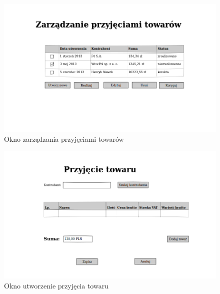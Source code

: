 \begin{figure}[!htb]
  \begin{center}
    \includegraphics[scale=0.45]{../img/interfejs/zarzadzanie-przyjeciami-towaru.png}
  \end{center}
  \caption{Okno zarządzania przyjęciami towarów}
\end{figure}
\FloatBarrier

\begin{figure}[!htb]
  \begin{center}
    \includegraphics[scale=0.45]{../img/interfejs/utworzenie-przyjecia-towaru.png}
  \end{center}
  \caption{Okno utworzenie przyjęcia towaru}
\end{figure}
\FloatBarrier

